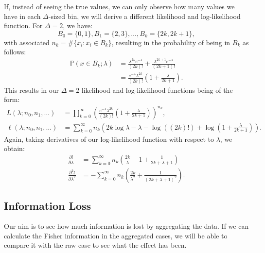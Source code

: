 \documentclass[11pt,a4,twosided,singlespacing,titlepagenumber=on,numbers=endperiod]{scrreprt}
\numberwithin{equation}{chapter} %
\theoremstyle{remark}
\begin{document}
If, instead of seeing the true values, we can only observe how many values we have in each $\Delta$-sized bin, we will derive a different likelihood and log-likelihood function. For $\Delta=2$, we have:
\begin{equation*}
	B_0 = \{0, 1\}, B_1 = \{2, 3 \}, \dots, B_k = \{ 2k, 2k+1 \},
\end{equation*}
with associated $n_k = \#\{x_i: x_i \in B_k\}$, resulting in the probability of being in $B_k$ as follows:
\begin{equation}\label{eq:pois_bin_prob}
	\begin{aligned}
		\mathbb{P}(x \in B_k; \lambda) &= \frac{\lambda^{2k}e^{- \lambda}}{(2k)!} + \frac{\lambda^{2k+1}e^{-\lambda}}{(2k+1)!} \\
		&= \frac{e^{-\lambda}\lambda^{2k}}{(2k)!} \left( 1+ \frac{\lambda}{2k+1} \right).
	\end{aligned}
\end{equation}
This results in our $\Delta=2$ likelihood and log-likelihood functions being of the form:
\begin{equation*}
	\begin{aligned}
	L(\lambda; n_0, n_1, \dots) &= \prod_{k=0}^\infty \left(\frac{e^{-\lambda}\lambda^{2k}}{(2k)!} \left( 1+ \frac{\lambda}{2k+1} \right) \right)^{n_k},\\
	\ell(\lambda; n_0, n_1, \dots) &= \sum_{k=0}^\infty n_k \left( 2k \log\lambda - \lambda - \log((2k)!) + \log \left(1 + \frac{\lambda}{2k+1} \right)\right).
	\end{aligned}
\end{equation*}
Again, taking derivatives of our log-likelihood function with respect to $\lambda$, we obtain:
\begin{equation*}
	\begin{aligned}
		\frac{\partial l}{\partial \lambda} &= \sum_{k=0}^\infty n_k \left(\frac{2k}{\lambda} - 1 + \frac{1}{2k + \lambda + 1} \right) \\
		\frac{\partial^2 l}{\partial \lambda^2} &= - \sum_{k=0}^\infty n_k \left( \frac{2k}{\lambda^2} + \frac{1}{(2k + \lambda + 1)^2} \right).
	\end{aligned}
\end{equation*}

\subsection{Information Loss}
Our aim is to see how much information is lost by aggregating the data. If we can calculate the Fisher information in the aggregated cases, we will be able to compare it with the raw case to see what the effect has been. 
\end{document}
